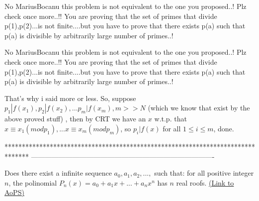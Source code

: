 \begin{solution}
	No MariusBocanu this problem is not equivalent to the one you proposed..! Plz check once more..!!
You are proving that the set of primes that divide p(1),p(2)...is not finite....but you have to prove that there exists p(a) such that p(a) is divisible by arbitrarily large number of primes..!
\end{solution}



\begin{solution}
	\begin{tcolorbox}No MariusBocanu this problem is not equivalent to the one you proposed..! Plz check once more..!!
You are proving that the set of primes that divide p(1),p(2)...is not finite....but you have to prove that there exists p(a) such that p(a) is divisible by arbitrarily large number of primes..!\end{tcolorbox}
That's why i said more or less. So, suppose $p_1|f(x_1), p_2|f(x_2),...p_m|f(x_m), m>>N$ (which we know that exist by the above proved stuff) , then by CRT we have an $x$ w.t.p. that $x\equiv x_1(mod p_1),...x\equiv x_m (mod p_m)$, so $p_i|f(x)$ for all $1 \le i \le m$, done.
\end{solution}
*******************************************************************************
-------------------------------------------------------------------------------

\begin{problem}
	Does there exist a infinite sequence $ a_0, a_1, a_2,...,$ such that: for all positive integer $n$, the polinomial $P_n(x)= a_0+a_1x+...+a_nx^{n} $ has $n$ real roofs.
	\flushright \href{https://artofproblemsolving.com/community/c6h566402}{(Link to AoPS)}
\end{problem}



